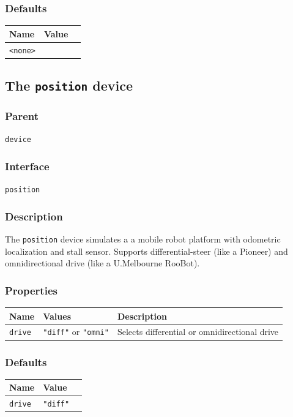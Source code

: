 \documentclass[11pt,twoside]{report}
\begin{document}
\subsubsection*{Defaults}
\begin{tabularx}{\columnwidth}{llX}
\hline
Name & Value\\
\hline
\verb'<none>'\\
\hline
\end{tabularx}



\newpage
\subsection{The {\tt position} device}

\subsubsection*{Parent}
{\tt device}

\subsubsection*{Interface}
{\tt position}

\subsubsection*{Description}
The {\tt position} device simulates a a mobile robot platform with
odometric localization and stall sensor. Supports differential-steer
(like a Pioneer) and omnidirectional drive (like a U.Melbourne
RooBot).

\subsubsection*{Properties}
\begin{tabularx}{\columnwidth}{llX}
\hline
Name & Values & Description \\
\hline
\verb'drive' & \verb'"diff"' or \verb'"omni"' & Selects differential or omnidirectional drive\\
\hline
\end{tabularx}

\subsubsection*{Defaults}
\begin{tabularx}{\columnwidth}{llX}
\hline Name & Value\\ 
\hline
\verb'drive' & \verb'"diff"'\\
\hline
\end{tabularx}
\end{document}
